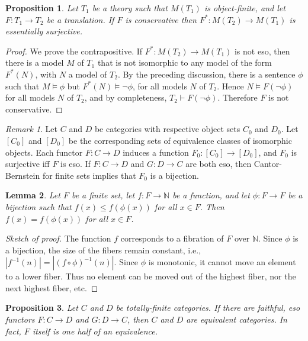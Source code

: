 \documentclass[12pt]{article}
\newtheorem{prop}{Proposition}
\newtheorem{lemma}[prop]{Lemma}
\theoremstyle{definition}
\theoremstyle{remark}
\newtheorem*{note}{Remark}
\newcommand{\3}{\mathcal}
\begin{document}
\begin{prop} Let $T_1$ be a theory such that $M(T_1)$ is
  object-finite, and let $F:T_1\to T_2$ be a translation. If $F$ is
  conservative then $F^*:M(T_2)\to M(T_1)$ is essentially
  surjective. \end{prop}

\begin{proof} We prove the contrapositive. If $F^*:M(T_2)\to M(T_1)$
  is not eso, then there is a model $M$ of $T_1$ that is not
  isomorphic to any model of the form $F^*(N)$, with $N$ a model of
  $T_2$. By the preceding discussion, there is a sentence $\phi$ such
  that $M\vDash \phi$ but $F^*(N)\vDash\neg \phi$, for all models $N$
  of $T_2$. Hence $N\vDash F(\neg \phi )$ for all models $N$ of $T_2$,
  and by completeness, $T_2\vdash F(\neg \phi )$. Therefore $F$ is not
  conservative. \end{proof}

\begin{note} Let $C$ and $D$ be categories with respective object sets
  $C_0$ and $D_0$. Let $[C_0]$ and $[D_0]$ be the corresponding sets
  of equivalence classes of isomorphic objects. Each functor
  $F:C\to D$ induces a function $F_0:[C_0]\to [D_0]$, and $F_0$ is
  surjective iff $F$ is eso. If $F:C\to D$ and $G:D\to C$ are both
  eso, then Cantor-Bernstein for finite sets implies that $F_0$ is a
  bijection. \end{note}

\begin{lemma} Let $F$ be a finite set, let $f:F\to\mathbb{N}$ be a
  function, and let $\phi :F\to F$ be a bijection such that
  $f(x)\leq f(\phi (x))$ for all $x\in F$. Then $f(x)=f(\phi (x))$ for
  all $x\in F$. \end{lemma}

\begin{proof}[Sketch of proof] The function $f$ corresponds to a
  fibration of $F$ over $\mathbb{N}$. Since $\phi$ is a bijection, the
  size of the fibers remain constant, i.e.,
  $|f^{-1}(n)|=|(f\circ \phi )^{-1}(n)|$. Since $\phi$ is monotonic,
  it cannot move an element to a lower fiber. Thus no element can be
  moved out of the highest fiber, nor the next highest fiber,
  etc. \end{proof}

\begin{prop} Let $C$ and $D$ be totally-finite categories. If there
  are faithful, eso functors $F:C\to D$ and $G:D\to C$, then $C$ and
  $D$ are equivalent categories. In fact, $F$ itself is one half of an
  equivalence. \end{prop}
\end{document}
